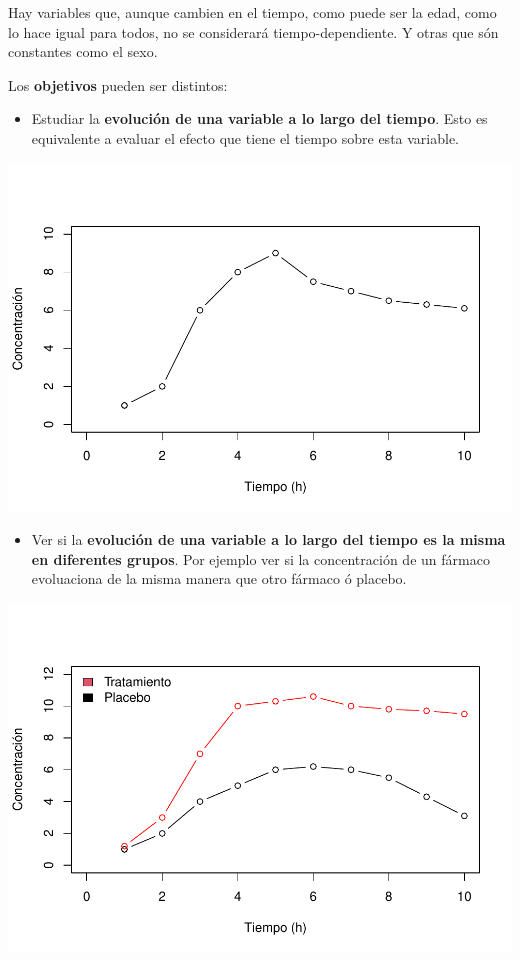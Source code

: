 \documentclass[
]{book}
\providecommand{\tightlist}{%
  \setlength{\itemsep}{0pt}\setlength{\parskip}{0pt}}
\begin{document}
Hay variables que, aunque cambien en el tiempo, como puede ser la edad, como lo hace igual para todos, no se considerará tiempo-dependiente. Y otras que són constantes como el sexo.

Los \textbf{objetivos} pueden ser distintos:

\begin{itemize}
\tightlist
\item
  Estudiar la \textbf{evolución de una variable a lo largo del tiempo}. Esto es equivalente a evaluar el efecto que tiene el tiempo sobre esta variable.
\end{itemize}

\includegraphics{fig_out/unnamed-chunk-2-1.pdf}

\begin{itemize}
\tightlist
\item
  Ver si la \textbf{evolución de una variable a lo largo del tiempo es la misma en diferentes grupos}. Por ejemplo ver si la concentración de un fármaco evoluaciona de la misma manera que otro fármaco ó placebo.
\end{itemize}

\includegraphics{fig_out/unnamed-chunk-3-1.pdf}
\end{document}
